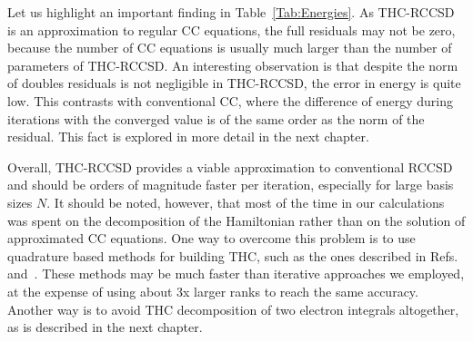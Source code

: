 %
Let us highlight an important finding in 
Table~\ref{Tab:Energies}. As THC-RCCSD is an approximation to regular CC 
equations, the full residuals may not be zero, because the number of CC 
equations is usually much larger than the number of parameters of THC-RCCSD. 
An interesting observation is that despite the norm of 
doubles residuals is not negligible in THC-RCCSD, the error in energy 
is quite low. This contrasts with conventional CC, where the 
difference of energy during iterations with the converged value  
is of the same order as the norm of the residual. This fact is explored in 
more detail in the next chapter. 

Overall, THC-RCCSD provides a viable approximation to conventional RCCSD and 
should be orders of magnitude faster per iteration, especially for large basis 
sizes $N$. It should be noted, however, that most of the time in our 
calculations was spent on the decomposition of the Hamiltonian rather
than on the solution of approximated CC equations. 
One way to overcome this problem is to use quadrature based methods for 
building THC, such as the ones described in Refs.~\cite{hohenstein_thc1} 
and~\cite{parrish2013discrete}. These methods may be much
faster than iterative approaches we employed, at the expense of 
using about 3x larger ranks to reach the same 
accuracy.\cite{parrish2013discrete} Another way is to avoid THC decomposition 
of two electron integrals altogether, as is described in the next 
chapter.

